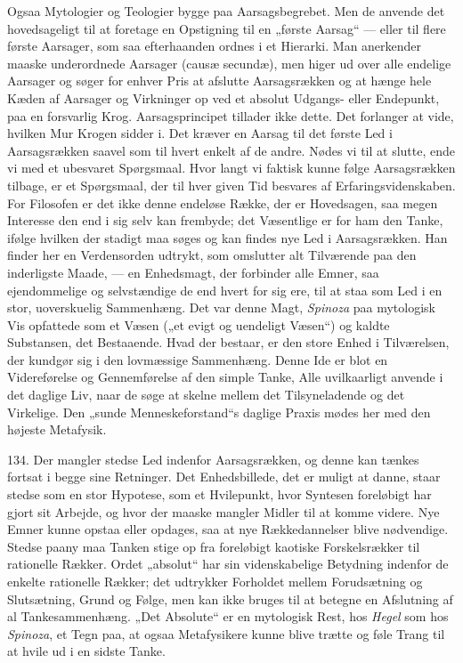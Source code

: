 \documentclass[12pt,a4paper]{book}
\newcommand{\apage}[1]{\marginnote{\footnotesize\textit{[#1]}}}
\begin{document}
Ogsaa Mytologier og Teologier bygge paa Aarsagsbegrebet. Men de anvende det hovedsageligt
til at foretage en Opstigning til en „første Aarsag“ --- eller til flere første Aarsager,
som saa efterhaanden ordnes i et Hierarki. Man anerkender maaske underordnede Aarsager
(causæ secundæ), men higer ud over alle endelige Aarsager og søger for enhver Pris at
afslutte Aarsagsrækken og at hænge hele Kæden af Aarsager og Virkninger op ved et absolut
Udgangs- eller Endepunkt, paa en forsvarlig Krog. Aarsagsprincipet tillader ikke dette.
Det forlanger at vide, hvilken Mur Krogen sidder i. Det kræver en Aarsag til det første
Led i Aarsagsrækken saavel som til hvert enkelt af de andre. Nødes vi til at slutte, ende
vi med et ubesvaret Spørgsmaal. Hvor langt vi faktisk kunne følge Aarsagsrækken tilbage,
er et Spørgsmaal, der til hver given Tid besvares af Erfaringsvidenskaben. For Filosofen
er det ikke denne endeløse Række, der er Hovedsagen, \apage{321}
saa megen Interesse den end i sig selv kan frembyde; det Væsentlige er for ham den
Tanke, ifølge hvilken der stadigt maa søges og kan findes nye Led i Aarsagsrækken. Han
finder her en Verdensorden udtrykt, som omslutter alt Tilværende paa den inderligste
Maade, --- en Enhedsmagt, der forbinder alle Emner, saa ejendommelige og selvstændige
de end hvert for sig ere, til at staa som Led i en stor, uoverskuelig Sammenhæng. Det
var denne Magt, \emph{Spinoza} paa mytologisk Vis opfattede som et Væsen („et evigt og
uendeligt Væsen“) og kaldte Substansen, det Bestaaende. Hvad der bestaar, er den store
Enhed i Tilværelsen, der kundgør sig i den lovmæssige Sammenhæng. Denne Ide er blot en
Videreførelse og Gennemførelse af den simple Tanke, Alle uvilkaarligt anvende i det
daglige Liv, naar de søge at skelne mellem det Tilsyneladende og det Virkelige. Den
„sunde Menneskeforstand“s daglige Praxis mødes her med den højeste Metafysik.

134. Der mangler stedse Led indenfor Aarsagsrækken, og denne kan tænkes fortsat i begge
sine Retninger. Det Enhedsbillede, det er muligt at danne, staar stedse som en stor
Hypotese, som et Hvilepunkt, hvor Syntesen foreløbigt har gjort sit Arbejde, og hvor
der maaske mangler Midler til at komme videre. Nye Emner kunne opstaa eller opdages, saa
at nye Rækkedannelser blive nødvendige. Stedse paany maa Tanken stige op fra foreløbigt
kaotiske Forskelsrækker til rationelle Rækker. Ordet „absolut“ har sin videnskabelige
Betydning indenfor de enkelte rationelle Rækker; det udtrykker Forholdet mellem
Forudsætning og Slutsætning, Grund og Følge, men kan ikke bruges til at betegne en
Afslutning af al Tankesammenhæng. „Det Absolute“ er en mytologisk Rest, hos \emph{Hegel}
som hos \emph{Spinoza}, et Tegn paa, at ogsaa Metafysikere kunne blive trætte og føle
Trang til at hvile ud i en sidste Tanke.
\end{document}
